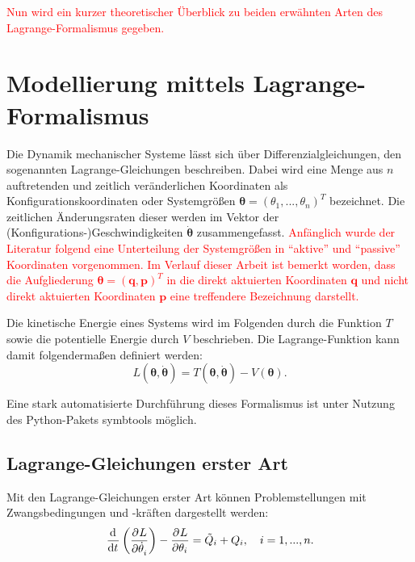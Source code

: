 \textcolor{red}{Nun wird ein kurzer theoretischer Überblick zu beiden erwähnten Arten des Lagrange-Formalismus gegeben.}

\section{Modellierung mittels Lagrange-Formalismus}
Die Dynamik mechanischer Systeme lässt sich über Differenzialgleichungen, den sogenannten Lagrange-Gleichungen beschreiben. Dabei wird eine Menge aus $n$ auftretenden und zeitlich veränderlichen Koordinaten als Konfigurationskoordinaten oder Systemgrößen $\boldsymbol{\theta} = (\theta_1, ..., \theta_n)^T$ bezeichnet. Die zeitlichen Änderungsraten dieser werden im Vektor der (Konfigurations-)Geschwindigkeiten $\dot{\boldsymbol{\theta}}$ zusammengefasst. \textcolor{red}{Anfänglich wurde der Literatur \cite[S.10]{DissKnoll} folgend eine Unterteilung der Systemgrößen in ``aktive'' und ``passive'' Koordinaten vorgenommen. Im Verlauf dieser Arbeit ist bemerkt worden, dass die 
Aufgliederung $\boldsymbol{\theta} = (\mathbf{q}, \mathbf{p})^T$ in die direkt aktuierten Koordinaten $\mathbf{q}$ und nicht direkt aktuierten Koordinaten $\mathbf{p}$ eine treffendere Bezeichnung darstellt.}
\cite[S.7]{DissKnoll} 

Die kinetische Energie eines Systems wird im Folgenden durch die Funktion $T$ sowie die potentielle Energie durch $V$ beschrieben. Die Lagrange-Funktion kann damit folgendermaßen definiert werden:
\begin{equation}
L(\boldsymbol{\theta}, \dot{\boldsymbol{\theta}}) = T(\boldsymbol{\theta}, \dot{\boldsymbol{\theta}}) - V(\boldsymbol{\theta}).
\end{equation}

Eine stark automatisierte Durchführung dieses Formalismus ist unter Nutzung des Python-Pakets symbtools \cite{symbtools} möglich.

\subsection{Lagrange-Gleichungen erster Art}
\label{sec:Lagrange1_theory}

Mit den Lagrange-Gleichungen erster Art können Problemstellungen mit Zwangsbedingungen und -kräften dargestellt werden:
\begin{equation}
	\label{eq:lagrange1}
	\frac{\mathrm{d}^{}}{\mathrm{d}{t}^{}}\left(\frac{\partial^{}L}{\partial{\dot{\theta}_i}^{}} \right) - \frac{\partial^{}L}{\partial{\theta_i}^{}} = \tilde{Q}_i + Q_i, \quad i = 1, ..., n.
\end{equation}

